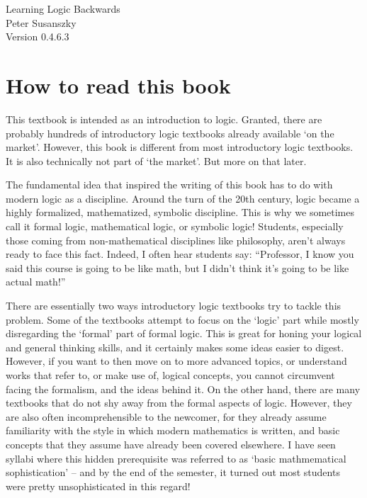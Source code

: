 
\noindent
Learning Logic Backwards\\
Peter Susanszky\\
Version 0.4.6.3
\doclicenseThis


\chapter{How to read this book}

This textbook is intended as an introduction to logic. Granted, there are probably hundreds of introductory logic textbooks already available `on the market'.  However, this book is different from most introductory logic textbooks. It is also technically not part of `the market'. But more on that later.

The fundamental idea that inspired the writing of this book has to do with modern logic as a discipline. Around the turn of the 20th century, logic became a highly formalized, mathematized, symbolic discipline. This is why we sometimes call it formal logic, mathematical logic, or symbolic logic! Students, especially those coming from non-mathematical disciplines like philosophy, aren't always ready to face this fact. Indeed, I often hear students say: ``Professor, I know you said this course is going to be like math, but I didn't think it's going to be like actual math!'' 

There are essentially two ways introductory logic textbooks try to tackle this problem. Some of the textbooks attempt to focus on the `logic' part while mostly disregarding the `formal' part of formal logic. This is great for honing your logical and general thinking skills, and it certainly makes some ideas easier to digest. However, if you want to then move on to more advanced topics, or understand works that refer to, or make use of, logical concepts, you cannot circumvent facing the formalism, and the ideas behind it. On the other hand, there are many textbooks that do not shy away from the formal aspects of logic. However, they are also often incomprehensible to the newcomer, for they already assume familiarity with the style in which modern mathematics is written, and basic concepts that they assume have already been covered elsewhere. I have seen syllabi where this hidden prerequisite was referred to as `basic mathmematical sophistication' -- and by the end of the semester, it turned out most students were pretty unsophisticated in this regard!

